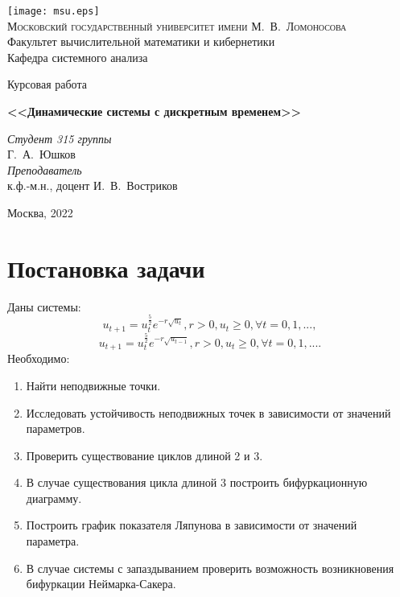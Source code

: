 \documentclass[12pt]{article}
\begin{document}
\thispagestyle{empty}
\begin{center}
\vspace{-3cm}

\texttt{[image: msu.eps]}\\

{\scshape Московский государственный университет имени М.~В.~Ломоносова}\\
Факультет вычислительной математики и кибернетики \\
Кафедра системного анализа

\vfill
{\LARGE Курсовая работа}
\vspace{3cm}

{\Huge\bfseries <<Динамические системы с дискретным временем>>}
\end{center}
\vspace{1cm}
\begin{flushright}
\large
\textit{Студент 315 группы}\\
Г.~А.~Юшков \\
\vspace{5mm}
\textit{Преподаватель}\\
к.ф.-м.н., доцент И.~В.~Востриков
\end{flushright}
\vfill
\begin{center}
Москва, 2022
\end{center}
\makeatother

\newpage
\tableofcontents

\newpage
\section{Постановка задачи}
Даны системы:
$$
    u_{t+1} = u_t^{\frac{5}{2}}e^{-r\sqrt{u_t}}, r > 0, u_t \geqslant 0, \forall t = 0, 1, ...,
$$
$$
    u_{t+1} = u_t^{\frac{5}{2}}e^{-r\sqrt{u_{t-1}}}, r > 0, u_t \geqslant 0, \forall t = 0, 1, ....
$$
Необходимо:
\begin{enumerate}
    \item Найти неподвижные точки.
    \item Исследовать устойчивость неподвижных точек в зависимости от значений параметров.
    \item Проверить существование циклов длиной 2 и 3.
    \item В случае существования цикла длиной 3 построить бифуркационную диаграмму.
    \item Построить график показателя Ляпунова в зависимости от значений параметра.
    \item В случае системы с запаздыванием проверить возможность возникновения бифуркации Неймарка-Сакера. 
\end{enumerate}
\end{document}
